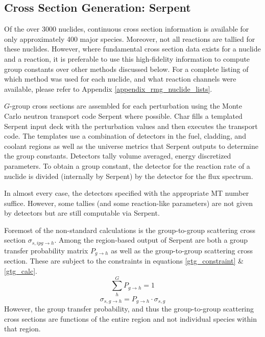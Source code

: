 \subsection{Cross Section Generation: Serpent}
\label{mg:xs_gen_serpent}
Of the over 3000 nuclides, continuous cross section information is available for only 
approximately 400 major species.  Moreover, not all reactions are tallied 
for these nuclides.  However, where fundamental cross section data exists for a nuclide
and a reaction, it is preferable to use this high-fidelity information to compute group
constants over other methods discussed below.  For a complete listing of which method was used for each nuclide, 
and what reaction channels were available, please refer to Appendix \ref{appendix_rmg_nuclide_lists}.

$G$-group cross sections are assembled for each perturbation using the Monte Carlo neutron
transport code Serpent \cite{Lepp2011} where possible.  Char fills a templated Serpent input deck with the
perturbation values and then executes the transport code.  The templates use a combination 
of detectors in the fuel, cladding, and coolant regions as well as the universe metrics that 
Serpent outputs to determine the group constants.  Detectors tally volume averaged, energy 
discretized parameters.  To obtain a group constant, the detector for the reaction rate of 
a nuclide is divided (internally by Serpent) by the detector for the flux spectrum.

In almost every case, the detectors specified with the appropriate MT number suffice.  
However, some tallies (and some reaction-like parameters) are not given by detectors
but are still computable via Serpent.

Foremost of the non-standard calculations is the group-to-group scattering cross section
$\sigma_{s,ipg\to h}$.  Among the region-based output of Serpent are both a group transfer
probability matrix $P_{g\to h}$ as well as the group-to-group scattering cross section.
These are subject to the constraints in equations \ref{gtg_constraint} \& \ref{gtg_calc}.
\begin{equation}
\label{gtg_constraint}
\sum_h^G P_{g\to h} = 1
\end{equation}
\begin{equation}
\label{gtg_calc}
\sigma_{s,g\to h} = P_{g\to h} \cdot \sigma_{s,g}
\end{equation}
However, the group transfer probability, and thus the group-to-group scattering cross sections
are functions of the entire region and not individual species within that region.  

